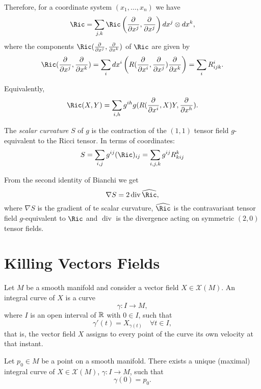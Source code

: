 Therefore, for a coordinate system $(x_1, \dots, x_n)$ we have
\[
	\Ric = \sum_{j,k} \Ric\left( \pd{}{x^j},\pd{}{x^j}  \right) dx^j \otimes dx^k,
\]
where the components $\Ric(\pd{}{x^j}, \pd{}{x^k})$ of $\Ric$ are given by
\[
	\Ric(\pd{}{x^j}, \pd{}{x^k}) = \sum_i dx^i \left( R(\pd{}{x^i}, \pd{}{x^j})\pd{}{x^k} \right) = \sum_i R^i_{ijk}.
\]

Equivalently,
\[
	\Ric(X,Y)  = \sum_{i,h} g^{ih} g(R(\pd{}{x^i}, X)Y, \pd{}{x^h}).
\]

\begin{definition}
	The \emph{scalar curvature} $S$ of $g$ is the contraction of the $(1,1)$ tensor field $g$-equivalent to the Ricci tensor. In terms of coordinates:
	\[
		S = \sum_{i,j} g^{ij}(\Ric)_{ij} = \sum_{i,j,k} g^{ij} R^k_{kij}
	\]
\end{definition}

From the second identity of Bianchi we get \cite[p. 88]{oneill83}
\[
	\nabla S = 2 \operatorname{div} \widehat{\Ric},
\]
where $\nabla S$ is the gradient of te scalar curvature, $\widehat{\Ric}$ is the contravariant tensor field $g$-equivalent to $\Ric$ and $\operatorname{div}$ is the divergence acting on symmetric $(2,0)$ tensor fields.

\section{Killing Vectors Fields}

\begin{definition}
	Let $M$ be a smooth manifold and consider a vector field $X \in \mathcal{X}(M)$.
	An integral curve of $X$ is a curve
	\[
		\gamma \colon I \to M,
	\]
	where $I$ is an open interval of $\mathbb{R}$ with $0 \in I$, such that
	\begin{equation}
		\label{eq:integralcurve}
		\gamma'(t) = X_{\gamma(t)} \quad \forall t \in I,
	\end{equation}
	that is, the vector field $X$ assigns to every point of the curve its own velocity at that instant.
\end{definition}

\begin{lemma}
	Let $p_0 \in M$ be a point on a smooth manifold. There exists a unique (maximal) integral curve of $X\in\mathcal{X}(M)$, $\gamma \colon I \to M$, such that
	\begin{equation}
		\label{eq:initcond}
		\gamma(0) = p_0.
	\end{equation}
\end{lemma}

